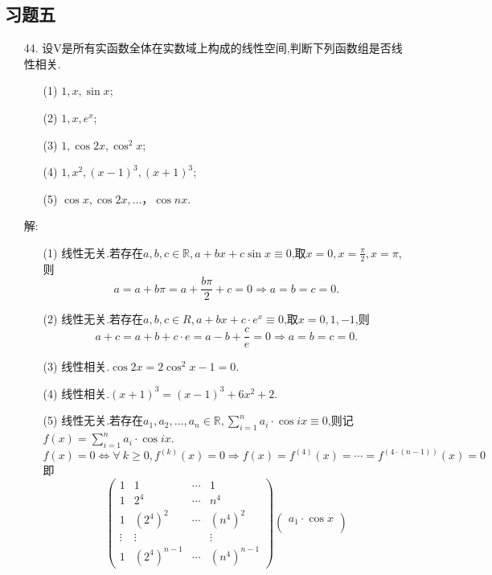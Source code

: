 \documentclass{article}
\begin{document}
\subsection{习题五}
\begin{enumerate}
    \item [44.]设V是所有实函数全体在实数域上构成的线性空间,判断下列函数组是否线性相关.
    \begin{enumerate}
        \item [(1)]$1,x, \sin x$;
        \item [(2)]$1,x,e^x$;
        \item [(3)]$1, \cos 2x, \cos ^2 x$;
        \item [(4)]$1,x^2,{(x-1)}^3,{(x+1)}^3$;
        \item [(5)]$\cos x,\cos 2x,\ldots，\cos nx$.
    \end{enumerate}
    解:
    \begin{enumerate}
        \item [(1)]线性无关.若存在$a,b,c\in \mathbb{R},a+bx+c\sin x\equiv 0$,取$x=0,x=\frac{\pi}{2},x=\pi$,则
        \[a=a+b\pi=a+\frac{b\pi}{2}+c=0\Rightarrow a=b=c=0.\]
        \item [(2)]线性无关.若存在$a,b,c\in R,a+bx+c\cdot e^x\equiv 0$,取$x=0,1,-1$,则
        \[a+c=a+b+c\cdot e=a-b+\frac{c}{e}=0\Rightarrow a=b=c=0.\]
        \item [(3)]线性相关.$\cos 2x=2\cos^2 x -1=0$.
        \item [(4)]线性相关.${(x+1)}^3={(x-1)}^3 +6x^2+2$.
        \item [(5)]线性无关.若存在$a_1,a_2,\ldots,a_n \in \mathbb{R},\sum\limits_{i=1}^n a_i\cdot \cos ix\equiv 0$,则记$f(x)=\sum\limits_{i=1}^n a_i\cdot \cos ix$.
        \[
            f(x)=0 \Leftrightarrow \forall\ k\geqslant 0,f^{(k)}(x)=0 \Rightarrow f(x)=f^{(4)}(x)=\cdots=f^{(4\cdot(n-1))}(x)=0
        \]
        即
        \[
            \begin{pmatrix}
                1 & 1 & \cdots & 1\\
                1 & 2^4 & \cdots & n^4\\
                1 & {(2^4)}^2 & \cdots & {(n^4)}^2\\
                \vdots & \vdots & & \vdots\\
                1 & {(2^4)}^{n-1} & \cdots & {(n^4)}^{n-1}
            \end{pmatrix}
            \begin{pmatrix}
                a_1\cdot \cos x\\

\end{pmatrix}\]
\end{enumerate}
\end{enumerate}
\end{document}
